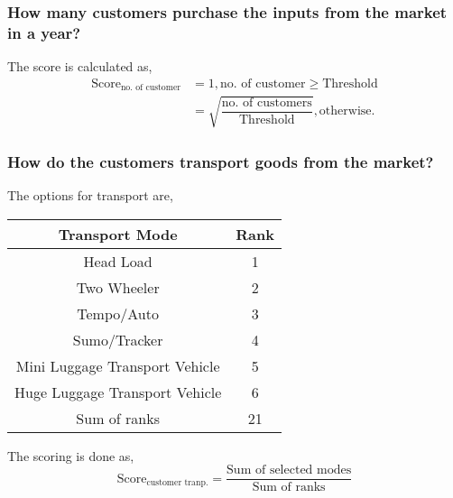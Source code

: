 \documentclass[oneside,twocolumn]{article}
\newcommand{\tsub}[2]{\text{#1}_{\text{#2}}}
\newcommand{\dsub}[2]{\dfrac{\text{#1}}{\text{#2}}}
\newenvironment{ttable}
               {\begin{center}
                 \begin{tabular}{c|c}
                   \hline
                   }
                   { \\ \hline
                 \end{tabular}
               \end{center}
               }
\begin{document}
\subsubsection{How many customers purchase the inputs from the market in a year?}
The score is calculated as,
\begin{align*}
  \tsub{Score}{no. of customer} &= 1, \text{no. of customer} \ge \text{Threshold} \\
  &= \sqrt{\dsub{no. of customers}{Threshold}}, \text{otherwise}.
\end{align*}

\subsubsection{How do the customers transport goods from the market?}
The options for transport are,
\begin{ttable}
  Transport Mode & Rank \\ \hline
  Head Load & 1 \\
  Two Wheeler & 2 \\
  Tempo/Auto & 3 \\
  Sumo/Tracker & 4 \\
  Mini Luggage Transport Vehicle & 5 \\
  Huge Luggage Transport Vehicle & 6 \\ \hline
  Sum of ranks & 21
\end{ttable}
The scoring is done as,
\[
\tsub{Score}{customer tranp.} = \dsub{Sum of selected modes}{Sum of ranks}
\]
\end{document}
